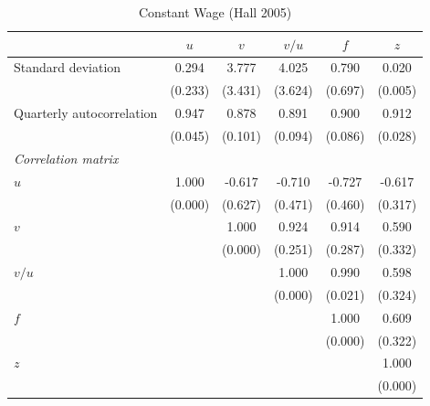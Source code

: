 \begin{table}[ht]
\centering
\caption{Constant Wage (Hall 2005)}
\label{tab:hall}
\begin{tabular}{lccccc}
\toprule
 & $u$ & $v$ & $v/u$ & $f$ & $z$ \\
\midrule
Standard deviation & 0.294 & 3.777 & 4.025 & 0.790 & 0.020 \\
 & (0.233) & (3.431) & (3.624) & (0.697) & (0.005) \\
\addlinespace
Quarterly autocorrelation & 0.947 & 0.878 & 0.891 & 0.900 & 0.912 \\
 & (0.045) & (0.101) & (0.094) & (0.086) & (0.028) \\
\midrule
\multicolumn{6}{l}{\textit{Correlation matrix}} \\
\addlinespace
$u$ & 1.000 & -0.617 & -0.710 & -0.727 & -0.617 \\
 & (0.000) & (0.627) & (0.471) & (0.460) & (0.317) \\
\addlinespace
$v$ &  & 1.000 & 0.924 & 0.914 & 0.590 \\
 &  & (0.000) & (0.251) & (0.287) & (0.332) \\
\addlinespace
$v/u$ &  &  & 1.000 & 0.990 & 0.598 \\
 &  &  & (0.000) & (0.021) & (0.324) \\
\addlinespace
$f$ &  &  &  & 1.000 & 0.609 \\
 &  &  &  & (0.000) & (0.322) \\
\addlinespace
$z$ &  &  &  &  & 1.000 \\
 &  &  &  &  & (0.000) \\
\bottomrule
\end{tabular}
\end{table}
